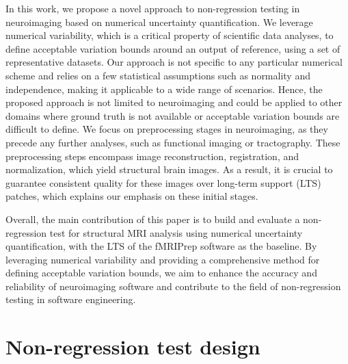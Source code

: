 \documentclass{article}
\newcommand{\fmriprep}{fMRIPrep\xspace}
\begin{document}
In this work, we propose a novel approach to non-regression testing in neuroimaging based on numerical uncertainty quantification. We leverage numerical variability, which is a critical property of scientific data analyses, to define acceptable variation bounds around an output of reference, using a set of representative datasets. Our approach is not specific to any particular numerical scheme and relies on a few statistical assumptions such as normality and independence, making it applicable to a wide range of scenarios. Hence, the proposed approach is not limited to neuroimaging and could be applied to other domains where ground truth is not available or acceptable variation bounds are difficult to define. We focus on preprocessing stages in neuroimaging, as they precede any further analyses, such as functional imaging or tractography. These preprocessing steps encompass image reconstruction, registration, and normalization, which yield structural brain images. As a result, it is crucial to guarantee consistent quality for these images over long-term support (LTS) patches, which explains our emphasis on these initial stages.

Overall, the main contribution of this paper is to build and evaluate a non-regression test for structural MRI analysis using numerical uncertainty quantification, with the LTS of the \fmriprep software as the baseline. By leveraging numerical variability and providing a comprehensive method for defining acceptable variation bounds, we aim to enhance the accuracy and reliability of neuroimaging software and contribute to the field of non-regression testing in software engineering.

\section{Non-regression test design}
\end{document}
